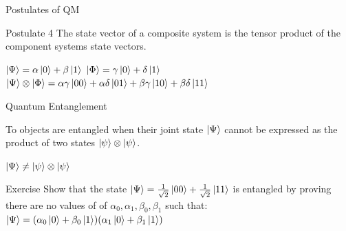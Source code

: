 \documentclass{beamer}
\begin{document}
\begin{frame}{Postulates of QM}
\begin{block}{Postulate 4}
    The state vector of a composite system is the tensor product of the component systems state vectors.
\end{block}\vfill
\centering
\begin{math}    
\ket{\Psi} = \alpha\ket{0} + \beta\ket{1}
\end{math} \vfill
\begin{math}    
\ket{\Phi} = \gamma\ket{0} + \delta\ket{1}
\end{math}
\vfill
\begin{math}
    \ket{\Psi} \otimes \ket{\Phi} = \alpha\gamma\ket{00} + \alpha\delta\ket{01} + \beta\gamma\ket{10} + \beta\delta\ket{11}
\end{math}\vfill
\end{frame}

\begin{frame}{Quantum Entanglement}
    \begin{definition}
    To objects are entangled when their joint state $\ket{\Psi}$ cannot be expressed as the product of two states $\ket{\psi}\otimes\ket{\psi}$.
    \end{definition}
    \vfill
    \begin{center}
        \begin{math}
            \ket{\Psi} \ne \ket{\psi}\otimes\ket{\psi}
        \end{math}
    \end{center}
    \pause
    \begin{block}{Exercise}
    Show that the state $\ket{\Psi} = \frac{1}{\sqrt{2}}\ket{00} + \frac{1}{\sqrt{2}}\ket{11}$ is entangled by proving there are no values of of $\alpha_0, \alpha_1, \beta_0, \beta_1$ such that:\vfill
    \centering
    \begin{math}
        \ket{\Psi} = (\alpha_0\ket{0} + \beta_0\ket{1})(\alpha_1\ket{0} + \beta_1\ket{1})
    \end{math}\vfill
    \end{block}
\end{frame}
\end{document}
